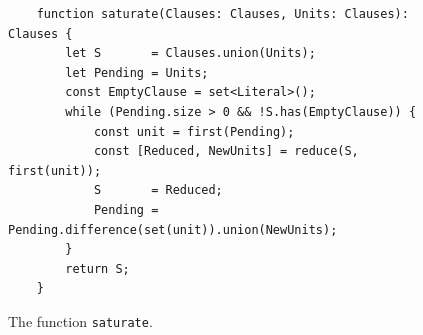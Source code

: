 \begin{figure}[!ht]
  \centering
\begin{verbatim}
    function saturate(Clauses: Clauses, Units: Clauses): Clauses {
        let S       = Clauses.union(Units);
        let Pending = Units;
        const EmptyClause = set<Literal>();
        while (Pending.size > 0 && !S.has(EmptyClause)) {
            const unit = first(Pending);
            const [Reduced, NewUnits] = reduce(S, first(unit));
            S       = Reduced;
            Pending = Pending.difference(set(unit)).union(NewUnits);
        }
        return S;
    }
\end{verbatim}
\vspace*{-0.3cm}
  \caption{The function \texttt{saturate}. }
  \label{fig:saturate}
\end{figure}
